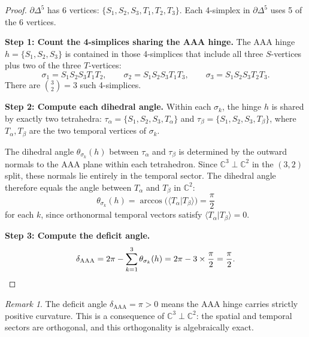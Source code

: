 \documentclass[12pt]{article}
\theoremstyle{remark}
\newtheorem{remark}[theorem]{Remark}
\begin{document}
\begin{proof}
$\partial\Delta^5$ has 6 vertices: $\{S_1, S_2, S_3, T_1, T_2, T_3\}$.
Each 4-simplex in $\partial\Delta^5$ uses 5 of the 6 vertices.

\medskip\noindent
\textbf{Step 1: Count the 4-simplices sharing the AAA hinge.}
The AAA hinge $h = \{S_1, S_2, S_3\}$ is contained in those 4-simplices
that include all three $S$-vertices plus two of the three $T$-vertices:
\begin{equation}
\sigma_1 = S_1 S_2 S_3 T_1 T_2, \qquad
\sigma_2 = S_1 S_2 S_3 T_1 T_3, \qquad
\sigma_3 = S_1 S_2 S_3 T_2 T_3.
\end{equation}
There are $\binom{3}{2} = 3$ such 4-simplices.

\medskip\noindent
\textbf{Step 2: Compute each dihedral angle.}
Within each $\sigma_k$, the hinge $h$ is shared by exactly two
tetrahedra: $\tau_\alpha = \{S_1, S_2, S_3, T_\alpha\}$ and
$\tau_\beta = \{S_1, S_2, S_3, T_\beta\}$, where $T_\alpha, T_\beta$
are the two temporal vertices of $\sigma_k$.

The dihedral angle $\theta_{\sigma_k}(h)$ between $\tau_\alpha$ and
$\tau_\beta$ is determined by the outward normals to the AAA plane
within each tetrahedron. Since $\mathbb{C}^3 \perp \mathbb{C}^2$ in
the $(3,2)$ split, these normals lie entirely in the temporal sector.
The dihedral angle therefore equals the angle between $T_\alpha$ and
$T_\beta$ in $\mathbb{C}^2$:
\begin{equation}
\theta_{\sigma_k}(h) =
\arccos\bigl(\langle T_\alpha | T_\beta \rangle\bigr) = \frac{\pi}{2}
\end{equation}
for each $k$, since orthonormal temporal vectors satisfy
$\langle T_\alpha | T_\beta \rangle = 0$.

\medskip\noindent
\textbf{Step 3: Compute the deficit angle.}
\begin{equation}
\delta_{\mathrm{AAA}} = 2\pi - \sum_{k=1}^{3} \theta_{\sigma_k}(h)
= 2\pi - 3 \times \frac{\pi}{2} = \frac{\pi}{2}. \qedhere
\end{equation}
\end{proof}

\begin{remark}
The deficit angle $\delta_{\mathrm{AAA}} = \pi > 0$ means the AAA
hinge carries strictly positive curvature. This is a consequence of
$\mathbb{C}^3 \perp \mathbb{C}^2$: the spatial and temporal sectors
are orthogonal, and this orthogonality is algebraically exact.
\end{remark}
\end{document}

